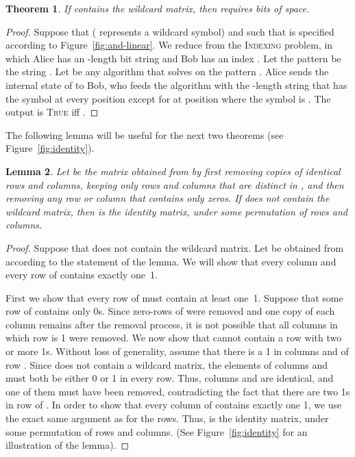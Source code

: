 \documentclass{article}
\newcommand{\TRUE}{\textsc{True}\xspace}
\newcommand{\indexing}{\textsc{Indexing}\xspace}
\theoremstyle{plain}
\newtheorem{theorem}{Theorem}[]
\newtheorem{lemma}[theorem]{Lemma}
\theoremstyle{definition}
\begin{document}
\begin{theorem}
    \label{thm:and-linear}
    If  contains the wildcard matrix, then  requires  bits of space.
\end{theorem}
\begin{proof}
    Suppose that  ( represents a wildcard symbol) and  such that  is specified according to Figure~\ref{fig:and-linear}. We reduce from the \indexing problem, in which Alice has an -length bit string  and Bob has an index . Let the pattern  be the string . Let  be any algorithm that solves  on the pattern . Alice sends the internal state of  to Bob, who feeds the algorithm with the -length string that has the symbol  at every position except for at position  where the symbol is . The output is \TRUE iff .
\end{proof}



\noindent The following lemma will be useful for the next two theorems (see Figure~\ref{fig:identity}).

\begin{lemma}
    \label{lem:identity}
    Let  be the matrix obtained from  by first removing copies of identical rows and columns, keeping only rows and columns that are distinct in , and then removing any row or column that contains only zeros. If  does not contain the wildcard matrix, then  is the identity matrix, under some permutation of rows and columns.
\end{lemma}
\begin{proof}
    Suppose that  does not contain the wildcard matrix. Let  be obtained from  according to the statement of the lemma. We will show that every column and every row of  contains exactly one~1.

    First we show that every row of  must contain at least one~1. Suppose that some row  of  contains only 0s. Since zero-rows of  were removed and one copy of each column remains after the removal process, it is not possible that all columns in which row  is 1 were removed. We now show that  cannot contain a row  with two or more 1s. Without loss of generality, assume that there is a 1 in columns  and  of row . Since  does not contain a wildcard matrix, the elements of columns  and  must both be either 0 or 1 in every row. Thus, columns  and  are identical, and one of them must have been removed, contradicting the fact that there are two 1s in row  of . In order to show that every column of  contains exactly one 1, we use the exact same argument as for the rows. Thus,  is the identity matrix, under some permutation of rows and columns. (See Figure~\ref{fig:identity} for an illustration of the lemma).
\end{proof}
\end{document}
